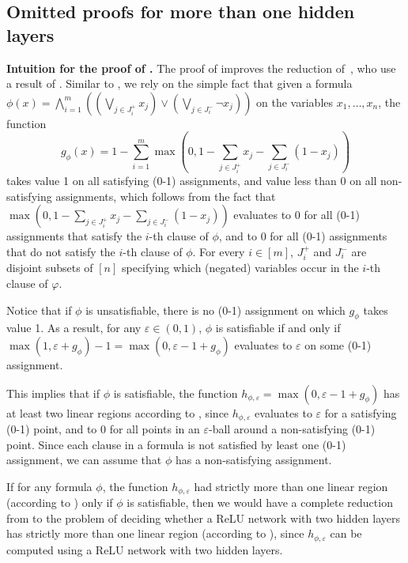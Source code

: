 \documentclass{article}
\begin{document}
\subsection{Omitted proofs for more than one hidden layers}
\label{sec:omitted_proofs_deep}
\textbf{Intuition for the proof of .}
The proof of  improves the reduction of~\citet{wang2022estimation}, who use a result of \citet[Appendix I]{katz2017reluplex}.
Similar to \citet[Appendix I]{katz2017reluplex}, we rely on the simple fact that given a \SAT{} formula $\phi(x)=\bigwedge_{i=1}^m((\bigvee_{j\in J^+_i}x_j) \vee (\bigvee_{j\in J^-_i}\neg x_j))$ on the variables $x_1,\dots, x_n$, the function
\[
g_\phi(x) = 1 - \sum_{i=1}^m \max(0, 1-\sum_{j\in J^+_i}x_j-\sum_{j\in J^-_i}(1-x_j))
\]
takes value 1 on all satisfying (0-1) assignments, and value less than 0 on all non-satisfying assignments, which follows from the fact that $\max(0, 1-\sum_{j\in J^+_i}x_j-\sum_{j\in J^-_i}(1-x_j))$ evaluates to 0 for all (0-1) assignments that satisfy the $i$-th clause of $\phi$, and to 0 for all (0-1) assignments that do not satisfy the $i$-th clause of $\phi$.
For every $i \in [m]$, $J_i^+$ and $J^-_i$ are disjoint subsets of $[n]$ specifying which (negated) variables occur in the $i$-th clause of $\varphi$.

Notice that if $\phi$ is unsatisfiable, there is no (0-1) assignment on which $g_\phi$ takes value 1. As a result, for any $\varepsilon\in (0,1)$, $\phi$ is satisfiable if and only if $\max(1, \varepsilon + g_\phi) - 1 = \max(0, \varepsilon-1 + g_\phi)$ evaluates to $\varepsilon$ on some (0-1) assignment.

This implies that if $\phi$ is satisfiable, the function $h_{\phi, \varepsilon}= \max(0, \varepsilon-1 + g_\phi)$ has at least two linear regions according to , since $h_{\phi, \varepsilon}$ evaluates to $\varepsilon$ for a satisfying (0-1) point, and to 0 for all points in an $\varepsilon$-ball around a non-satisfying (0-1) point. Since each clause in a \SAT{} formula is not satisfied by least one (0-1) assignment, we can assume that $\phi$ has a non-satisfying assignment.

If for any \SAT{} formula $\phi$, the function $h_{\phi, \varepsilon}$ had strictly more than one linear region (according to ) only if $\phi$ is satisfiable, then we would have a complete reduction from \SAT{} to the problem of deciding whether a ReLU network with two hidden layers has strictly more than one linear region (according to ), since $h_{\phi, \varepsilon}$ can be computed using a ReLU network with two hidden layers.
\end{document}
